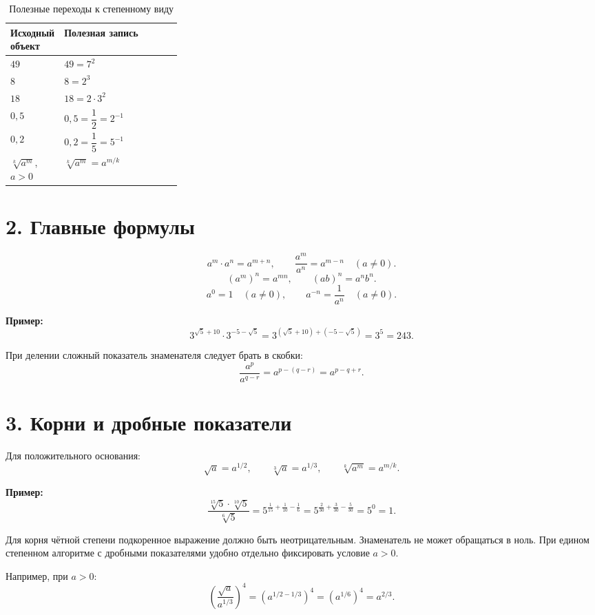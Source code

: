 \documentclass[a4paper,12pt]{article}
\begin{document}
\renewcommand{\arraystretch}{1.35}
\begin{table}[htbp]
\centering
\caption{Полезные переходы к степенному виду}
\begin{tabularx}{\linewidth}{@{}p{0.29\linewidth}X@{}}
\toprule
\textbf{Исходный объект} & \textbf{Полезная запись}\\
\midrule
\(49\) & \(49=7^2\)\\
\(8\) & \(8=2^3\)\\
\(18\) & \(18=2\cdot3^2\)\\
\(0{,}5\) & \(0{,}5=\dfrac12=2^{-1}\)\\
\(0{,}2\) & \(0{,}2=\dfrac15=5^{-1}\)\\
\(\sqrt[k]{a^m}\), \(a>0\) & \(\sqrt[k]{a^m}=a^{m/k}\)\\
\bottomrule
\end{tabularx}
\end{table}

\section*{2. Главные формулы}
\[
a^m\cdot a^n=a^{m+n},\qquad
\frac{a^m}{a^n}=a^{m-n}\quad(a\ne0).
\]
\[
(a^m)^n=a^{mn},\qquad (ab)^n=a^n b^n.
\]
\[
a^0=1\quad(a\ne0),\qquad a^{-n}=\frac1{a^n}\quad(a\ne0).
\]

\textbf{Пример:}
\[
3^{\sqrt5+10}\cdot3^{-5-\sqrt5}
=3^{(\sqrt5+10)+(-5-\sqrt5)}
=3^5=243.
\]

При делении сложный показатель знаменателя следует брать в скобки:
\[
\frac{a^p}{a^{q-r}}=a^{p-(q-r)}=a^{p-q+r}.
\]

\section*{3. Корни и дробные показатели}
Для положительного основания:
\[
\sqrt a=a^{1/2},\qquad \sqrt[3]{a}=a^{1/3},\qquad \sqrt[k]{a^m}=a^{m/k}.
\]

\textbf{Пример:}
\[
\frac{\sqrt[15]{5}\cdot\sqrt[10]{5}}{\sqrt[6]{5}}
=5^{\frac1{15}+\frac1{10}-\frac16}
=5^{\frac2{30}+\frac3{30}-\frac5{30}}
=5^0=1.
\]

Для корня чётной степени подкоренное выражение должно быть неотрицательным. Знаменатель не может обращаться в ноль. При едином степенном алгоритме с дробными показателями удобно отдельно фиксировать условие \(a>0\).

Например, при \(a>0\):
\[
\left(\frac{\sqrt a}{a^{1/3}}\right)^4
=\left(a^{1/2-1/3}\right)^4
=\left(a^{1/6}\right)^4
=a^{2/3}.
\]
\end{document}
